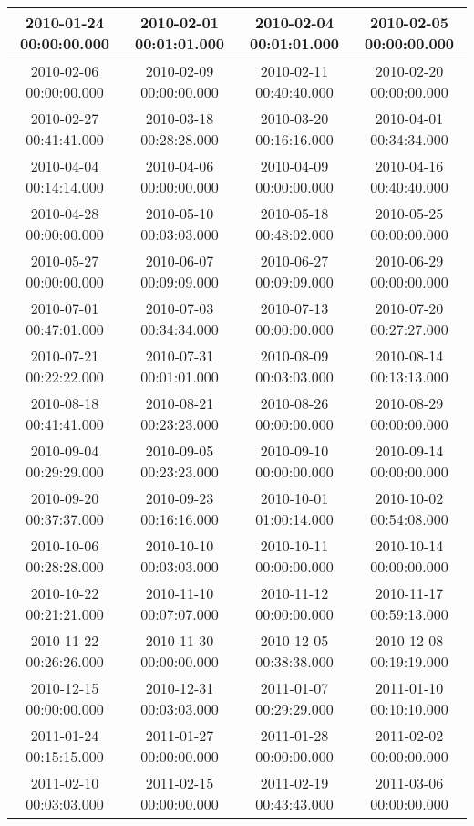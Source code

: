 \begin{longtable}{c c c c}
2010-01-24 00:00:00.000 & 
2010-02-01 00:01:01.000 & 
2010-02-04 00:01:01.000 & 
2010-02-05 00:00:00.000 \\ \midrule
2010-02-06 00:00:00.000 & 
2010-02-09 00:00:00.000 & 
2010-02-11 00:40:40.000 & 
2010-02-20 00:00:00.000 \\ \midrule
2010-02-27 00:41:41.000 & 
2010-03-18 00:28:28.000 & 
2010-03-20 00:16:16.000 & 
2010-04-01 00:34:34.000 \\ \midrule
2010-04-04 00:14:14.000 & 
2010-04-06 00:00:00.000 & 
2010-04-09 00:00:00.000 & 
2010-04-16 00:40:40.000 \\ \midrule
2010-04-28 00:00:00.000 & 
2010-05-10 00:03:03.000 & 
2010-05-18 00:48:02.000 & 
2010-05-25 00:00:00.000 \\ \midrule
2010-05-27 00:00:00.000 & 
2010-06-07 00:09:09.000 & 
2010-06-27 00:09:09.000 & 
2010-06-29 00:00:00.000 \\ \midrule
2010-07-01 00:47:01.000 & 
2010-07-03 00:34:34.000 & 
2010-07-13 00:00:00.000 & 
2010-07-20 00:27:27.000 \\ \midrule
2010-07-21 00:22:22.000 & 
2010-07-31 00:01:01.000 & 
2010-08-09 00:03:03.000 & 
2010-08-14 00:13:13.000 \\ \midrule
2010-08-18 00:41:41.000 & 
2010-08-21 00:23:23.000 & 
2010-08-26 00:00:00.000 & 
2010-08-29 00:00:00.000 \\ \midrule
2010-09-04 00:29:29.000 & 
2010-09-05 00:23:23.000 & 
2010-09-10 00:00:00.000 & 
2010-09-14 00:00:00.000 \\ \midrule
2010-09-20 00:37:37.000 & 
2010-09-23 00:16:16.000 & 
2010-10-01 01:00:14.000 & 
2010-10-02 00:54:08.000 \\ \midrule
2010-10-06 00:28:28.000 & 
2010-10-10 00:03:03.000 & 
2010-10-11 00:00:00.000 & 
2010-10-14 00:00:00.000 \\ \midrule
2010-10-22 00:21:21.000 & 
2010-11-10 00:07:07.000 & 
2010-11-12 00:00:00.000 & 
2010-11-17 00:59:13.000 \\ \midrule
2010-11-22 00:26:26.000 & 
2010-11-30 00:00:00.000 & 
2010-12-05 00:38:38.000 & 
2010-12-08 00:19:19.000 \\ \midrule
2010-12-15 00:00:00.000 & 
2010-12-31 00:03:03.000 & 
2011-01-07 00:29:29.000 & 
2011-01-10 00:10:10.000 \\ \midrule
2011-01-24 00:15:15.000 & 
2011-01-27 00:00:00.000 & 
2011-01-28 00:00:00.000 & 
2011-02-02 00:00:00.000 \\ \midrule
2011-02-10 00:03:03.000 & 
2011-02-15 00:00:00.000 & 
2011-02-19 00:43:43.000 & 
2011-03-06 00:00:00.000 \\ \midrule

\end{longtable}
